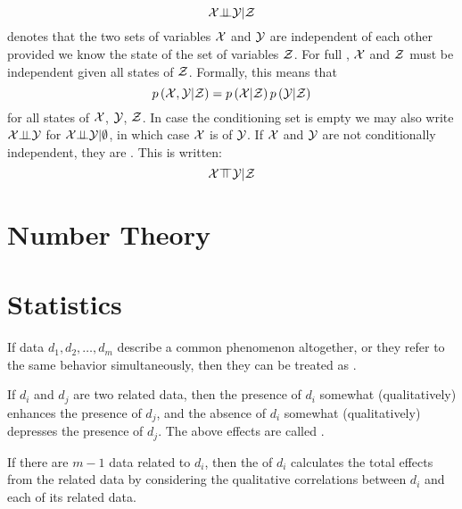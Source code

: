 \begin{defi}
\begin{equation}
\mathcal{X}\bot\!\!\!\bot\mathcal{Y}|\mathcal{Z}
\end{equation}
denotes that the two sets of variables $\mathcal{X}$ and $\mathcal{Y}$ are independent of each other provided we know the state of the set of variables $\mathcal{Z}$. For full , $\mathcal{X}$ and $\mathcal{Z}$ must be independent given all states of $\mathcal{Z}$. Formally, this means that
\begin{equation}
p\left(\mathcal{X},\mathcal{Y}|\mathcal{Z}\right)=p\left(\mathcal{X}|\mathcal{Z}\right)p\left(\mathcal{Y}|\mathcal{Z}\right)
\end{equation}
for all states of $\mathcal{X}$, $\mathcal{Y}$, $\mathcal{Z}$. In case the conditioning set is empty we may also write $\mathcal{X}\bot\!\!\!\bot\mathcal{Y}$ for $\mathcal{X}\bot\!\!\!\bot\mathcal{Y}|\emptyset$, in which case $\mathcal{X}$ is  of $\mathcal{Y}$. If $\mathcal{X}$ and $\mathcal{Y}$ are not conditionally independent, they are . This is written:
\begin{equation}
\mathcal{X}\top\!\!\!\top\mathcal{Y}|\mathcal{Z}
\end{equation}
\cite{Barber2011}
\end{defi}

\section{Number Theory}

\section{Statistics}

\begin{defi}
If data $d_1,d_2,\ldots,d_m$ describe a common phenomenon altogether, or they refer to the same behavior simultaneously, then they can be treated as .
\cite{conf/ijcai/ZhaoN95}
\end{defi}

\begin{defi}
If $d_i$ and $d_j$ are two related data, then the presence of $d_i$ somewhat (qualitatively) enhances the presence of $d_j$, and the absence of $d_i$ somewhat (qualitatively) depresses the presence of $d_j$. The above effects are called .
\cite{conf/ijcai/ZhaoN95}
\end{defi}

\begin{defi}
If there are $m-1$ data related to $d_i$, then the  of $d_i$ calculates the total effects from the related data by considering the qualitative correlations between $d_i$ and each of its related data.
\cite{conf/ijcai/ZhaoN95}
\end{defi}

